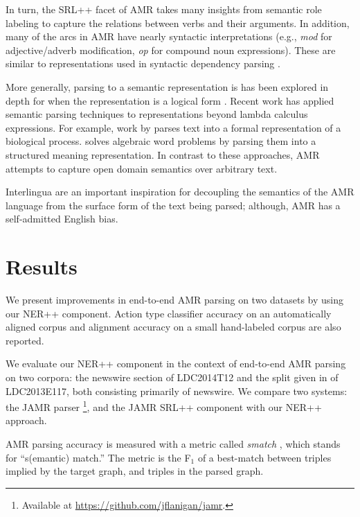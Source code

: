\documentclass[11pt]{article}
\newcommand\w[1]{\textit{#1}} %
\newcommand\e[1]{\textit{#1}} %
\begin{document}
In turn, the SRL++ facet of AMR takes many insights from semantic role labeling
  \cite{2002gildea-srl,2004punyakanok-srl,srikumar2013-srl} to capture the
  relations between verbs and their arguments.
In addition, many of the arcs in AMR have nearly syntactic interpretations
  (e.g., \e{mod} for adjective/adverb modification, \e{op} for compound noun
  expressions).
These are similar to representations used in syntactic dependency parsing
  \cite{stanford-dependencies,2005mcdonald-dependency0,2006buchholz-conll}.

More generally, parsing to a semantic representation is has been explored in
  depth for when the representation is a logical form
  \cite{2005kate-semantics,2005zettlemoyer-semantics,2011liang-semantics}.
Recent work has applied semantic parsing techniques to representations beyond
  lambda calculus expressions.
For example, work by  parses
  text into a formal representation of a biological process.
 solves algebraic word problems by parsing them
  into a structured meaning representation.
In contrast to these approaches, AMR attempts to capture open domain semantics
  over arbitrary text.

Interlingua
  \cite{1991mitamura-interlingua,1999carbonell-interlingua,1998levin-interlingua}
  are an important inspiration for decoupling the semantics of the AMR language
  from the surface form of the text being parsed; although, AMR has a self-admitted
  English bias.




\section{Results}
We present improvements in end-to-end AMR parsing on two datasets by using our NER++ component.
Action type classifier accuracy on an automatically aligned corpus
and alignment accuracy on a small hand-labeled corpus are also reported.

We evaluate our NER++ component in the context of end-to-end AMR parsing
on two corpora: the newswire section of LDC2014T12 and the split given in \cite{2014flanigan-amr} of LDC2013E117, both consisting primarily of newswire.
We compare two systems: the JAMR parser \cite{2014flanigan-amr}
\footnote{Available at \url{https://github.com/jflanigan/jamr}.},
  and the JAMR SRL++ component with our NER++ approach.

AMR parsing accuracy is measured with a metric called \w{smatch} \cite{cai2013smatch-amr}, which stands 
  for ``s(emantic) match.'' 
The metric is the F$_1$ of a best-match between triples implied by the target graph, 
  and triples in the parsed graph. 
\end{document}
